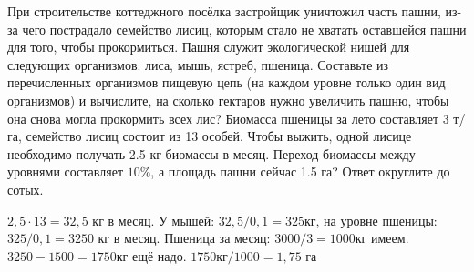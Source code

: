 
При
строительстве коттеджного посёлка застройщик уничтожил часть пашни, из-за чего
пострадало семейство лисиц, которым стало не хватать оставшейся пашни для того,
чтобы прокормиться. Пашня служит экологической нишей для следующих организмов:
лиса, мышь, ястреб, пшеница. Составьте из перечисленных организмов пищевую цепь (на каждом уровне только один вид организмов) и вычислите, на сколько гектаров нужно увеличить пашню, чтобы она снова могла
прокормить всех лис? Биомасса пшеницы за лето составляет 3 т/га, семейство лисиц
состоит из 13  особей. Чтобы выжить, одной лисице необходимо получать 2.5 кг
биомассы в месяц. Переход биомассы между уровнями составляет $10\%$, а площадь
пашни сейчас 1.5 га? Ответ округлите до сотых.

\soultionSection

$2,5 \cdot 13=32,5$ кг в месяц. У мышей: $32,5/0,1 = 325$кг, на уровне пшеницы: $325/0,1 = 3250$ кг в месяц. 
Пшеница за месяц: $3000/3=1000$кг имеем. $3250-1500 = 1750$кг ещё надо. $1750кг/1000=1,75$ га

